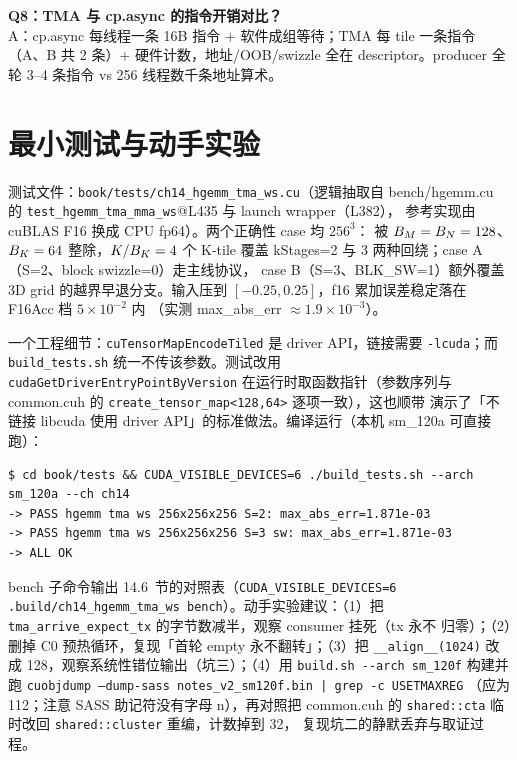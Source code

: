 \textbf{Q8：TMA 与 cp.async 的指令开销对比？}\\
A：cp.async 每线程一条 16B 指令 + 软件成组等待；TMA 每 tile 一条指令（A、B
共 2 条）+ 硬件计数，地址/OOB/swizzle 全在 descriptor。producer 全轮
3--4 条指令 vs 256 线程数千条地址算术。

\section{最小测试与动手实验}

测试文件：\texttt{book/\allowbreak{}tests/\allowbreak{}ch14\_\allowbreak{}hgemm\_\allowbreak{}tma\_\allowbreak{}ws.cu}（逻辑抽取自
bench/hgemm.cu 的 \texttt{test\_\allowbreak{}hgemm\_\allowbreak{}tma\_\allowbreak{}mma\_\allowbreak{}ws}@L435 与 launch wrapper（L382），
参考实现由 cuBLAS F16 换成 CPU fp64）。两个正确性 case 均 $256^3$：
被 $B\sb{M} = B\sb{N} = 128$、$B\sb{K} = 64$ 整除，$K/B\sb{K} = 4$ 个 K-tile
覆盖 kStages=2 与 3 两种回绕；case A（S=2、block swizzle=0）走主线协议，
case B（S=3、BLK\_SW=1）额外覆盖 3D grid 的越界早退分支。输入压到
$[-0.25, 0.25]$，f16 累加误差稳定落在 F16Acc 档 $5\times10^{-2}$ 内
（实测 max\_abs\_err $\approx 1.9\times10^{-3}$）。

一个工程细节：\texttt{cu\allowbreak{}Tensor\allowbreak{}Map\allowbreak{}Encode\allowbreak{}Tiled} 是 driver API，链接需要
\texttt{-lcuda}；而 \texttt{build\_\allowbreak{}tests.\allowbreak{}sh} 统一不传该参数。测试改用
\texttt{cuda\allowbreak{}Get\allowbreak{}Driver\allowbreak{}Entry\allowbreak{}Point\allowbreak{}By\allowbreak{}Version} 在运行时取函数指针（参数序列与
common.cuh 的 \texttt{create\_\allowbreak{}tensor\_\allowbreak{}map\allowbreak{}<128,\allowbreak{}64>} 逐项一致），这也顺带
演示了「不链接 libcuda 使用 driver API」的标准做法。编译运行（本机
sm\_120a 可直接跑）：

\begin{lstlisting}[style=console]
$ cd book/tests && CUDA_VISIBLE_DEVICES=6 ./build_tests.sh --arch sm_120a --ch ch14
-> PASS hgemm tma ws 256x256x256 S=2: max_abs_err=1.871e-03
-> PASS hgemm tma ws 256x256x256 S=3 sw: max_abs_err=1.871e-03
-> ALL OK
\end{lstlisting}

bench 子命令输出 14.6~节的对照表（\texttt{CUDA\_\allowbreak{}VISIBLE\_\allowbreak{}DEVICES=\allowbreak{}6
.\allowbreak{}build/\allowbreak{}ch14\_\allowbreak{}hgemm\_\allowbreak{}tma\_\allowbreak{}ws bench}）。动手实验建议：（1）把
\texttt{tma\_\allowbreak{}arrive\_\allowbreak{}expect\_\allowbreak{}tx} 的字节数减半，观察 consumer 挂死（tx 永不
归零）；（2）删掉 C0 预热循环，复现「首轮 empty 永不翻转」；（3）把
\texttt{\_\allowbreak{}\_\allowbreak{}align\_\allowbreak{}\_\allowbreak{}(1024)} 改成 128，观察系统性错位输出（坑三）；（4）用
\texttt{build.sh -{}-arch sm\_120f} 构建并跑
\texttt{cuobjdump --dump-sass notes\_v2\_sm120f.bin | grep -c USETMAXREG}
（应为 112；注意 SASS 助记符没有字母 n），再对照把 common.cuh 的
\texttt{shared::cta} 临时改回 \texttt{shared::cluster} 重编，计数掉到 32，
复现坑二的静默丢弃与取证过程。

